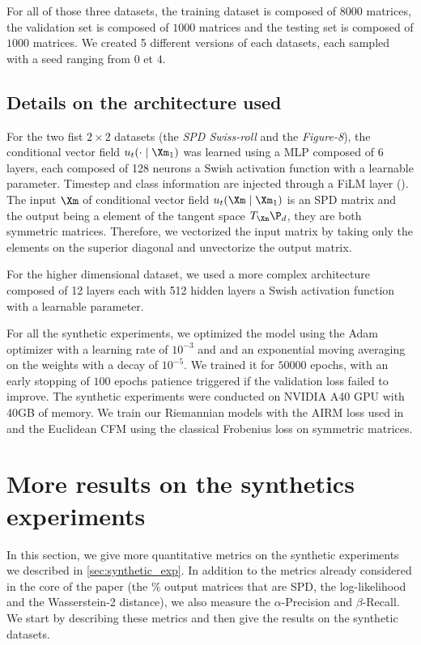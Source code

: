 \documentclass[10pt]{article} %
\theoremstyle{plain}
\theoremstyle{definition}
\theoremstyle{remark}
\begin{document}
For all of those three datasets, the training dataset is composed of $8000$ matrices, the validation set is composed of $1000$ matrices and the testing set is composed of $1000$ matrices. We created 5 different versions of each datasets, each sampled with a seed ranging from $0$ et $4$.

\subsection{Details on the architecture used}
For the two fist $2 \times 2$ datasets (the \emph{SPD Swiss-roll} and the \emph{Figure-8}), the conditional vector field $u_t(\cdot \mid \Xm_1)$ was learned using a MLP composed of 6 layers, each composed of 128 neurons a Swish activation function \citep{ramachandran2017searchingactivationfunctions} with a learnable parameter. Timestep and class information are injected through a FiLM layer (\cite{perez2018film}). The input $\Xm$ of conditional vector field $u_t(\Xm \mid \Xm_1)$ is an SPD matrix and the output being a element of the tangent space $T_{\Xm} \P_d$, they are both symmetric matrices. Therefore, we vectorized the input matrix by taking only the elements on the superior diagonal and unvectorize the output matrix.

For the higher dimensional dataset, we used a more complex architecture composed of 12 layers each with 512 hidden layers a Swish activation function \citep{ramachandran2017searchingactivationfunctions} with a learnable parameter.

For all the synthetic experiments, we optimized the model using the Adam optimizer \citep{kingma2017adammethodstochasticoptimization} with a learning rate of $10^{-3}$ and and an exponential moving averaging on the weights \citep{PolyakAcceleration} with a decay of $10^{-5}$. We trained it for $50000$ epochs, with an early stopping of $100$ epochs patience triggered if the validation loss failed to improve. The synthetic experiments were conducted on NVIDIA A40 GPU with 40GB of memory. We train our Riemannian models with the AIRM loss used in \citet{chen2024flow} and the Euclidean CFM using the classical Frobenius loss on symmetric matrices.

\section{More results on the synthetics experiments}
\label{appendix:more_results_synthetics}
In this section, we give more quantitative metrics on the synthetic experiments we described in \cref{sec:synthetic_exp}. In addition to the metrics already considered in the core of the paper (the \% output matrices that are SPD, the log-likelihood and the Wasserstein-2 distance), we also measure the $\alpha$-Precision and $\beta$-Recall. We start by describing these metrics and then give the results on the synthetic datasets.
\end{document}
